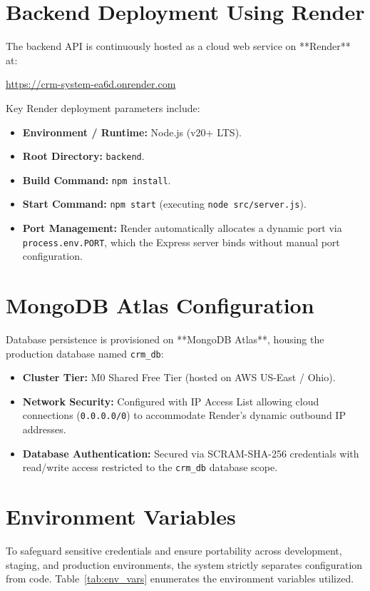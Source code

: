 \section{Backend Deployment Using Render}
The backend API is continuously hosted as a cloud web service on **Render** at:
\begin{center}
    \url{https://crm-system-ea6d.onrender.com}
\end{center}
Key Render deployment parameters include:
\begin{itemize}
    \item \textbf{Environment / Runtime:} Node.js (v20+ LTS).
    \item \textbf{Root Directory:} \texttt{backend}.
    \item \textbf{Build Command:} \texttt{npm install}.
    \item \textbf{Start Command:} \texttt{npm start} (executing \texttt{node src/server.js}).
    \item \textbf{Port Management:} Render automatically allocates a dynamic port via \texttt{process.env.PORT}, which the Express server binds without manual port configuration.
\end{itemize}

\section{MongoDB Atlas Configuration}
Database persistence is provisioned on **MongoDB Atlas**, housing the production database named \texttt{crm\_db}:
\begin{itemize}
    \item \textbf{Cluster Tier:} M0 Shared Free Tier (hosted on AWS US-East / Ohio).
    \item \textbf{Network Security:} Configured with IP Access List allowing cloud connections (\texttt{0.0.0.0/0}) to accommodate Render's dynamic outbound IP addresses.
    \item \textbf{Database Authentication:} Secured via SCRAM-SHA-256 credentials with read/write access restricted to the \texttt{crm\_db} database scope.
\end{itemize}

\section{Environment Variables}
To safeguard sensitive credentials and ensure portability across development, staging, and production environments, the system strictly separates configuration from code. Table~\ref{tab:env_vars} enumerates the environment variables utilized.


